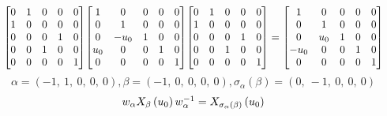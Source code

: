 \documentclass[11pt]{article}
\theoremstyle{definition}
\begin{document}
\[
\scaletoalign{\textwidth}{{\left[\begin{matrix}0 & 1 & 0 & 0 & 0\\1 & 0 & 0 & 0 & 0\\0 & 0 & 0 & 1 & 0\\0 & 0 & 1 & 0 & 0\\0 & 0 & 0 & 0 & 1\end{matrix}\right]} {\left[\begin{matrix}1 & 0 & 0 & 0 & 0\\0 & 1 & 0 & 0 & 0\\0 & - u_{0} & 1 & 0 & 0\\u_{0} & 0 & 0 & 1 & 0\\0 & 0 & 0 & 0 & 1\end{matrix}\right]} {\left[\begin{matrix}0 & 1 & 0 & 0 & 0\\1 & 0 & 0 & 0 & 0\\0 & 0 & 0 & 1 & 0\\0 & 0 & 1 & 0 & 0\\0 & 0 & 0 & 0 & 1\end{matrix}\right]} = {\left[\begin{matrix}1 & 0 & 0 & 0 & 0\\0 & 1 & 0 & 0 & 0\\0 & u_{0} & 1 & 0 & 0\\- u_{0} & 0 & 0 & 1 & 0\\0 & 0 & 0 & 0 & 1\end{matrix}\right]}}
\]
\[
\alpha = \left( -1, \  1, \  0, \  0, \  0\right), \beta = \left( -1, \  0, \  0, \  0, \  0\right), \sigma_{\alpha}(\beta) = \left( 0, \  -1, \  0, \  0, \  0\right)
\]
\[
\scaletoalign{\textwidth}{w_{\alpha} X_{\beta}\left(u_{0}\right) w_{\alpha}^{-1} = X_{\sigma_{\alpha}\left(\beta\right)}\left(u_{0}\right)}
\]
\end{document}

